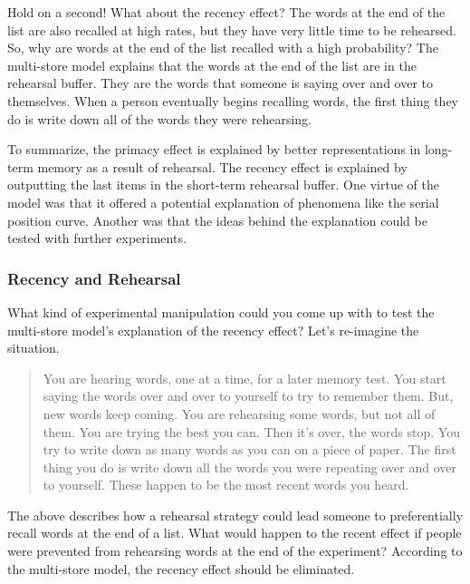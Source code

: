 \documentclass[
  oneside,
  12pt]{crumpbook}
\begin{document}
Hold on a second! What about the recency effect? The words at the end of the list are also recalled at high rates, but they have very little time to be rehearsed. So, why are words at the end of the list recalled with a high probability? The multi-store model explains that the words at the end of the list are in the rehearsal buffer. They are the words that someone is saying over and over to themselves. When a person eventually begins recalling words, the first thing they do is write down all of the words they were rehearsing.

To summarize, the primacy effect is explained by better representations in long-term memory as a result of rehearsal. The recency effect is explained by outputting the last items in the short-term rehearsal buffer. One virtue of the model was that it offered a potential explanation of phenomena like the serial position curve. Another was that the ideas behind the explanation could be tested with further experiments.

\hypertarget{recency-and-rehearsal}{%
\subsubsection{Recency and Rehearsal}\label{recency-and-rehearsal}}

What kind of experimental manipulation could you come up with to test the multi-store model's explanation of the recency effect? Let's re-imagine the situation.

\begin{quote}
You are hearing words, one at a time, for a later memory test. You start saying the words over and over to yourself to try to remember them. But, new words keep coming. You are rehearsing some words, but not all of them. You are trying the best you can. Then it's over, the words stop. You try to write down as many words as you can on a piece of paper. The first thing you do is write down all the words you were repeating over and over to yourself. These happen to be the most recent words you heard.
\end{quote}

The above describes how a rehearsal strategy could lead someone to preferentially recall words at the end of a list. What would happen to the recent effect if people were prevented from rehearsing words at the end of the experiment? According to the multi-store model, the recency effect should be eliminated.
\end{document}
